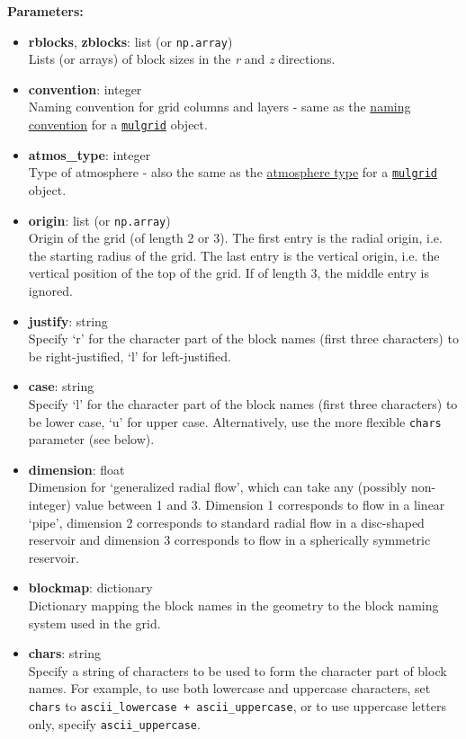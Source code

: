 \textbf{Parameters:}
\begin{itemize}
\item \textbf{rblocks}, \textbf{zblocks}: list (or \texttt{np.array})\\
  Lists (or arrays) of block sizes in the \emph{r} and \emph{z} directions.
\item \textbf{convention}: integer\\
  Naming convention for grid columns and layers - same as the \hyperref[geometry_format_conventions]{naming convention} for a \hyperref[mulgrids]{\texttt{mulgrid}} object.
\item \textbf{atmos\_type}: integer\\
  Type of atmosphere - also the same as the \hyperref[geometry_format_conventions]{atmosphere type} for a \hyperref[mulgrids]{\texttt{mulgrid}} object.
\item \textbf{origin}: list (or \texttt{np.array})\\
  Origin of the grid (of length 2 or 3).  The first entry is the radial origin, i.e. the starting radius of the grid.  The last entry is the vertical origin, i.e. the vertical position of the top of the grid.  If of length 3, the middle entry is ignored.
\item \textbf{justify}: string\\
  Specify `r' for the character part of the block names (first three characters) to be right-justified, `l' for left-justified.
\item \textbf{case}: string\\
  Specify `l' for the character part of the block names (first three characters) to be lower case, `u' for upper case. Alternatively, use the more flexible \texttt{chars} parameter (see below).
\item \textbf{dimension}: float\\
  Dimension for `generalized radial flow', which can take any (possibly non-integer) value between 1 and 3.  Dimension 1 corresponds to flow in a linear `pipe', dimension 2 corresponds to standard radial flow in a disc-shaped reservoir and dimension 3 corresponds to flow in a spherically symmetric reservoir.
\item \textbf{blockmap}: dictionary\\
  Dictionary mapping the block names in the geometry to the block naming system used in the grid.
\item \textbf{chars}: string\\
  Specify a string of characters to be used to form the character part of block names.  For example, to use both lowercase and uppercase characters, set \texttt{chars} to \texttt{ascii\_lowercase + ascii\_uppercase}, or to use uppercase letters only, specify \texttt{ascii\_uppercase}.
\end{itemize}

